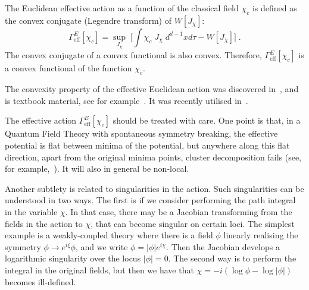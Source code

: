 \documentclass[11pt]{article}
\numberwithin{equation}{section}
\newcommand{\be}{\begin{equation}} \newcommand{\ee}{\end{equation}}
\begin{document}
The Euclidean effective action as a function of the classical field $\chi_c$ is defined as the convex conjugate (Legendre transform) of $W[J_{\chi}]$:
	\be
	\Gamma^E_{\mathrm{eff}}[\chi_c] = \sup_{J_\chi}\;\Big[\int \chi_c \; J_{\chi}  \;d^{d-1}x d\tau  - W[J_{\chi}] \Big] \;.
	\label{effacclf}
	\ee
	The convex conjugate of a convex functional is also convex. Therefore, $\Gamma^E_{\mathrm{eff}}[\chi_c]$ is a convex functional of the function $\chi_c$. 

The convexity property of the effective Euclidean action was discovered in~\cite{Iliopoulos:1974ur}, and is textbook material, see for example~\cite{Duncan:2012aja}. It was recently utilised in~\cite{Moser:2021bes}. 	
	
The effective action $\Gamma^E_{\mathrm{eff}}[\chi_c]$ should be treated with care. One point is that, in a Quantum Field Theory with spontaneous symmetry breaking, the effective potential is flat between minima of the potential, but anywhere along this flat direction, apart from the original minima points, cluster decomposition fails (see, for example,~\cite{Duncan:2012aja}). It will also in general be non-local. 

Another subtlety is related to singularities in the action. Such singularities can be understood in two ways. The first is if we consider performing the path integral in the variable $\chi$. In that case, there may be a Jacobian transforming from the fields in the action to $\chi$, that can become singular on certain loci. The simplest example is a weakly-coupled theory where there is a field $\phi$ linearly realising the symmetry $\phi \rightarrow e^{i\xi} \phi$, and we write $\phi = |\phi|e^{i\chi}$. Then the Jacobian develops a logarithmic singularity over the locus $|\phi|=0$. The second way is to perform the integral in the original fields, but then we have that $\chi = -i \left( \log \phi - \log |\phi|\right)$ becomes ill-defined. 
\end{document}
